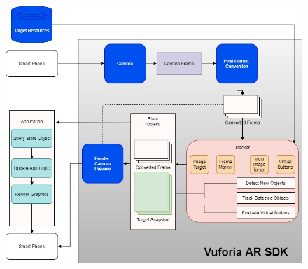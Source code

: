 \documentclass{aifyp}
\begin{document}
\begin{appendices}
\begin{figure}[H]
          \includegraphics[scale=0.4]{Images/Chapter5/VuforiaARSDK.jpg}
          \label{fig:VuforiaARSDK}
\end{figure}

\end{appendices}
\end{document}
